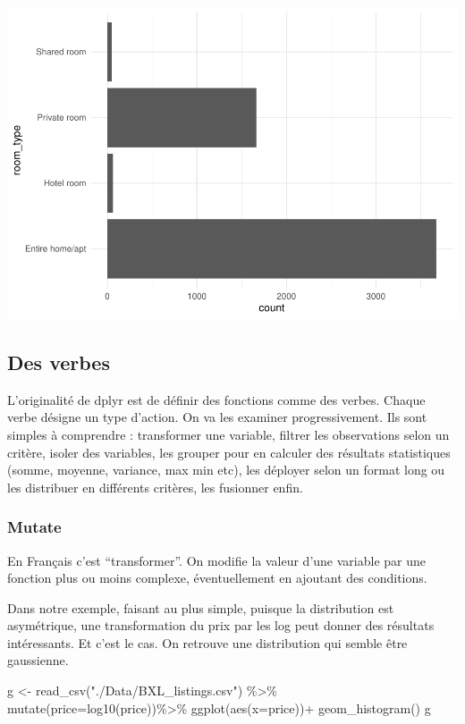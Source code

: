 \documentclass[
]{book}
\newenvironment{Shaded}{\begin{snugshade}}{\end{snugshade}}
\newcommand{\AttributeTok}[1]{\textcolor[rgb]{0.77,0.63,0.00}{#1}}
\newcommand{\FunctionTok}[1]{\textcolor[rgb]{0.00,0.00,0.00}{#1}}
\newcommand{\NormalTok}[1]{#1}
\newcommand{\OtherTok}[1]{\textcolor[rgb]{0.56,0.35,0.01}{#1}}
\newcommand{\SpecialCharTok}[1]{\textcolor[rgb]{0.00,0.00,0.00}{#1}}
\newcommand{\StringTok}[1]{\textcolor[rgb]{0.31,0.60,0.02}{#1}}
\begin{document}
\includegraphics{bookdown-demo_files/figure-latex/0203-1.pdf}

\hypertarget{des-verbes}{%
\subsection{Des verbes}\label{des-verbes}}

L'originalité de dplyr est de définir des fonctions comme des verbes. Chaque verbe désigne un type d'action. On va les examiner progressivement. Ils sont simples à comprendre : transformer une variable, filtrer les observations selon un critère, isoler des variables, les grouper pour en calculer des résultats statistiques (somme, moyenne, variance, max min etc), les déployer selon un format long ou les distribuer en différents critères, les fusionner enfin.

\hypertarget{mutate}{%
\subsubsection{Mutate}\label{mutate}}

En Français c'est ``transformer''. On modifie la valeur d'une variable par une fonction plus ou moins complexe, éventuellement en ajoutant des conditions.

Dans notre exemple, faisant au plus simple, puisque la distribution est asymétrique, une transformation du prix par les log peut donner des résultats intéressants. Et c'est le cas. On retrouve une distribution qui semble être gaussienne.

\begin{Shaded}
\begin{Highlighting}[]
\NormalTok{g }\OtherTok{\textless{}{-}} \FunctionTok{read\_csv}\NormalTok{(}\StringTok{"./Data/BXL\_listings.csv"}\NormalTok{) }\SpecialCharTok{\%\textgreater{}\%} 
  \FunctionTok{mutate}\NormalTok{(}\AttributeTok{price=}\FunctionTok{log10}\NormalTok{(price))}\SpecialCharTok{\%\textgreater{}\%}
  \FunctionTok{ggplot}\NormalTok{(}\FunctionTok{aes}\NormalTok{(}\AttributeTok{x=}\NormalTok{price))}\SpecialCharTok{+}
  \FunctionTok{geom\_histogram}\NormalTok{()}
\NormalTok{g}
\end{Highlighting}
\end{Shaded}
\end{document}
